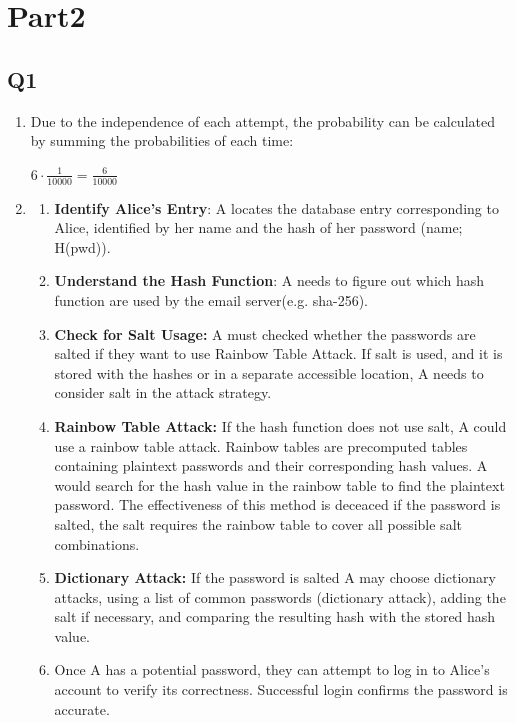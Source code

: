 \documentclass{article}
\begin{document}
\section{Part2}

\subsection{Q1}
	\begin{enumerate}
		\item Due to the independence of each attempt, the probability can be calculated by summing the probabilities of each time:
		\begin{center}
			$6 \cdot \frac{1}{10000} = \frac{6}{10000}$
		\end{center}

		\item 
		\begin{enumerate}
		    \item \textbf{Identify Alice's Entry}: A locates the database entry corresponding to Alice, identified by her name and the hash of her password (name; H(pwd)).
		    \item \textbf{Understand the Hash Function}: A needs to figure out which hash function are used by the email server(e.g. sha-256).

		    \item \textbf{Check for Salt Usage:} A must checked whether the passwords are salted if they want to use Rainbow Table Attack. If salt is used, and it is stored with the hashes or in a separate accessible location, A needs to consider salt in the attack strategy.
		    
		    \item \textbf{Rainbow Table Attack:} If the hash function does not use salt, A could use a rainbow table attack. Rainbow tables are precomputed tables containing plaintext passwords and their corresponding hash values\cite{5-2.security-protocol}. A would search for the hash value in the rainbow table to find the plaintext password. The effectiveness of this method is deceaced if the password is salted, the salt requires the rainbow table to cover all possible salt combinations.
		    
		    \item \textbf{Dictionary Attack:} If the password is salted  A may choose dictionary attacks, using a list of common passwords (dictionary attack), adding the salt if necessary, and comparing the resulting hash with the stored hash value\cite{info2222-solutions-week4}.
		    
		    \item Once A has a potential password, they can attempt to log in to Alice's account to verify its correctness. Successful login confirms the password is accurate.
		\end{enumerate}
\end{enumerate}
\end{document}

